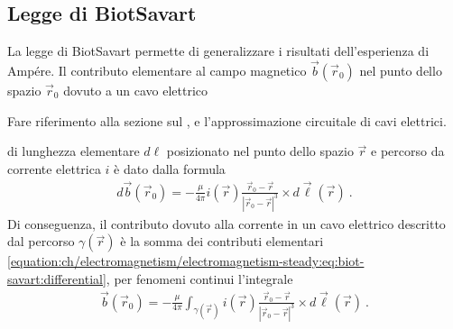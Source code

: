 \documentclass[letterpaper,10pt,italian]{jupyterBook}
\begin{document}
\subsection{Legge di Biot\sphinxhyphen{}Savart}
\label{\detokenize{ch/electromagnetism/electromagnetism-steady:legge-di-biot-savart}}\label{\detokenize{ch/electromagnetism/electromagnetism-steady:physics-hs-electromagnetism-electromagnetism-steady-biot-savart}}
\sphinxAtStartPar
La legge di Biot\sphinxhyphen{}Savart permette di generalizzare i risultati dell’esperienza di Ampére. Il contributo elementare al campo magnetico \(\vec{b}(\vec{r}_0)\) nel punto dello spazio \(\vec{r}_0\) dovuto a un cavo elettrico%
\begin{footnote}[1]\sphinxAtStartFootnote
Fare riferimento alla sezione sul {\hyperref[\detokenize{ch/electromagnetism/electric-current:electric-current-cable}]{}}, e l’approssimazione circuitale di cavi elettrici.
%
\end{footnote} di lunghezza elementare \(d \ell\) posizionato nel punto dello spazio \(\vec{r}\) e percorso da corrente elettrica \(i\) è dato dalla formula
\begin{equation}\label{equation:ch/electromagnetism/electromagnetism-steady:eq:biot-savart:differential}
\begin{split}d \vec{b}(\vec{r}_0) = - \frac{\mu}{4 \pi} i(\vec{r}) \frac{ \vec{r}_0 - \vec{r} }{| \vec{r}_0 - \vec{r} |^3} \times d \vec{\ell}(\vec{r}) \ .\end{split}
\end{equation}
\sphinxAtStartPar
Di conseguenza, il contributo dovuto alla corrente in un cavo elettrico descritto dal percorso \(\gamma(\vec{r})\) è la somma dei contributi elementari \eqref{equation:ch/electromagnetism/electromagnetism-steady:eq:biot-savart:differential}, per fenomeni continui l’integrale
\begin{equation}\label{equation:ch/electromagnetism/electromagnetism-steady:eq:biot-savart:integral}
\begin{split}\vec{b}(\vec{r}_0) = - \frac{\mu}{4 \pi} \int_{\gamma(\vec{r})} i(\vec{r})  \frac{ \vec{r}_0 - \vec{r} }{| \vec{r}_0 - \vec{r} |^3}\times d \vec{\ell}(\vec{r}) \ .\end{split}
\end{equation}
\sphinxAtStartPar
{} 

\sphinxAtStartPar
{} 
\end{document}
